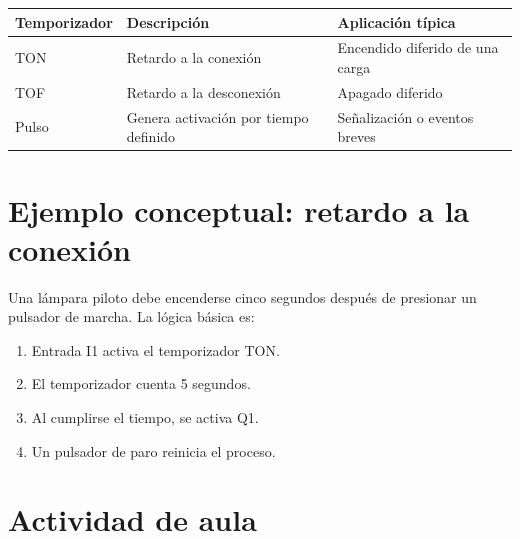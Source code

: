 \documentclass[
  spanish,
  letterpaper,
  DIV=11,
  numbers=noendperiod]{scrreprt}
\newcounter{none} %
\providecommand{\tightlist}{%
  \setlength{\itemsep}{0pt}\setlength{\parskip}{0pt}}
\begin{document}
{\def\LTcaptype{none} %
\begin{longtable}[]{@{}
  >{\raggedright\arraybackslash}p{}
  >{\raggedright\arraybackslash}p{}
  >{\raggedright\arraybackslash}p{}@{}}
\toprule\noalign{}
\begin{minipage}[b]{\linewidth}\raggedright
Temporizador
\end{minipage} & \begin{minipage}[b]{\linewidth}\raggedright
Descripción
\end{minipage} & \begin{minipage}[b]{\linewidth}\raggedright
Aplicación típica
\end{minipage} \\
\midrule\noalign{}
\endhead
\bottomrule\noalign{}
\endlastfoot
TON & Retardo a la conexión & Encendido diferido de una carga \\
TOF & Retardo a la desconexión & Apagado diferido \\
Pulso & Genera activación por tiempo definido & Señalización o eventos
breves \\
\end{longtable}
}

\section{Ejemplo conceptual: retardo a la
conexión}\label{ejemplo-conceptual-retardo-a-la-conexiuxf3n}

Una lámpara piloto debe encenderse cinco segundos después de presionar
un pulsador de marcha. La lógica básica es:

\begin{enumerate}
\def\labelenumi{\arabic{enumi}.}
\tightlist
\item
  Entrada I1 activa el temporizador TON.
\item
  El temporizador cuenta 5 segundos.
\item
  Al cumplirse el tiempo, se activa Q1.
\item
  Un pulsador de paro reinicia el proceso.
\end{enumerate}

\section{Actividad de aula}\label{actividad-de-aula-1}
\end{document}

